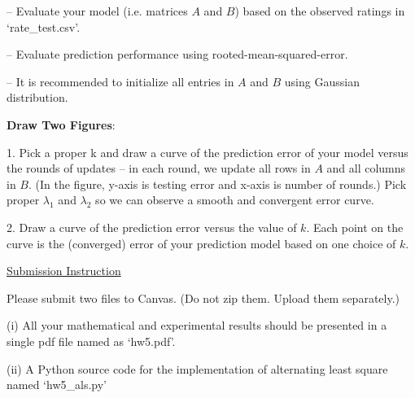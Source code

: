 \documentclass{llncs}
\begin{document}
-- Evaluate your model (i.e. matrices $A$ and $B$) 
based on the observed ratings in `rate\_test.csv'. 

-- Evaluate prediction performance using 
rooted-mean-squared-error. 

-- It is recommended to initialize all entries in 
$A$ and $B$ using Gaussian distribution. 

\textbf{Draw Two Figures}:

1. Pick a proper k and draw a curve of the prediction 
error of your model versus the rounds of updates -- in 
each round, we update  
all rows in $A$ and all columns in $B$. (In the figure, 
y-axis is testing error and x-axis is number of rounds.) 
Pick proper $\lambda_1$ and $\lambda_2$ so 
we can observe a smooth and convergent error curve. 

2. Draw a curve of the prediction error versus the 
value of $k$. Each point on the curve is the (converged)
error of your prediction model based on one choice of $k$.  

\newpage 
 
\underline{Submission Instruction}

Please submit two files to Canvas. (Do not 
zip them. Upload them separately.) 

(i) All your mathematical and experimental results 
should be presented in a single pdf file named 
as `hw5.pdf'. 

(ii) A Python source code for the 
implementation of alternating least square 
named `hw5\_als.py'
\end{document}
